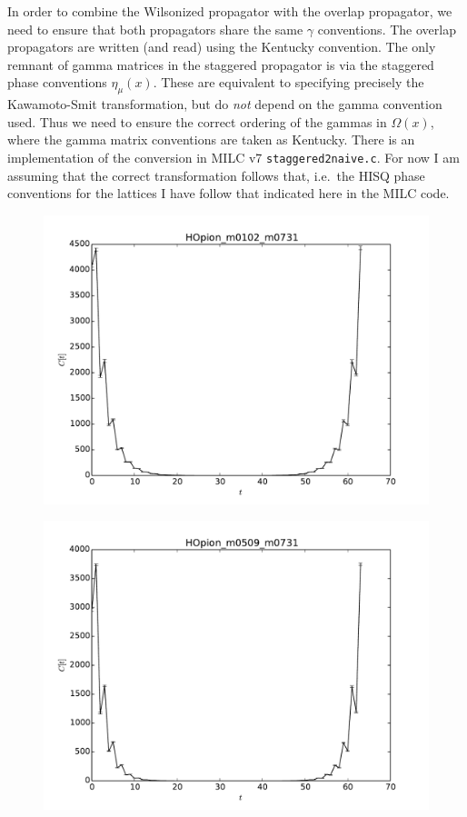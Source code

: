 \documentclass[11pt,a4paper]{article}
\begin{document}
In order to combine the Wilsonized propagator with the overlap propagator,
we need to ensure that both propagators share the same $\gamma$ conventions.
The overlap propagators are written (and read) using the Kentucky convention.
The only remnant of gamma matrices in the staggered propagator is via the staggered
phase conventions $\eta_\mu(x)$.  
These are equivalent to specifying precisely the Kawamoto-Smit transformation,
but do \emph{not} depend on the gamma convention used.  
Thus we need to ensure the correct ordering of the gammas in $\Omega(x)$,
 where the gamma matrix conventions are taken as Kentucky.
 There is an implementation of the conversion in MILC v7 {\tt staggered2naive.c}.
 For now I am assuming that the correct transformation follows that, 
 i.e.\ the HISQ phase conventions for the lattices I have follow that indicated here in the MILC code.
 
 
  \begin{figure}[h]
 \centering
 \includegraphics[width=\textwidth]{HOpion_m0102_m0731.pdf}
 \caption{}
 \end{figure}
 
 \begin{figure}[h]
 \centering
 \includegraphics[width=\textwidth]{HOpion_m0509_m0731.pdf}
 \caption{}
 \end{figure}
 
\end{document}
